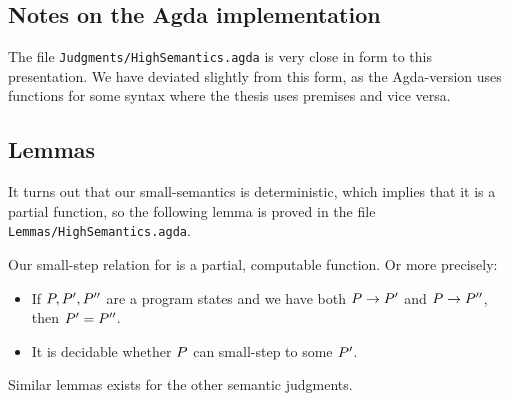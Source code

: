 
\subsection{Notes on the Agda implementation}

The file \texttt{Judgments/HighSemantics.agda} is very close in form to this
presentation. We have deviated slightly from this form, as the Agda-version uses
functions for some syntax where the thesis uses premises and vice versa.

\subsection{Lemmas}

It turns out that our small-semantics is deterministic, which implies that it is
a partial function, so the following lemma is proved in the file
\texttt{Lemmas/HighSemantics.agda}.

\begin{lemma}
  \label{lemma:computhigh}
  Our small-step relation for \ATAL is a partial, computable function. Or more
  precisely:

  \begin{itemize}
  \item If $P, P', P''$ are a program states and we have both
    ${P} -> {P'}$ and ${P} -> {P''}$, then
    $P' = P''$.
  \item It is decidable whether $P$ can small-step to some $P'$.
  \end{itemize}

  Similar lemmas exists for the other semantic judgments.
\end{lemma}

